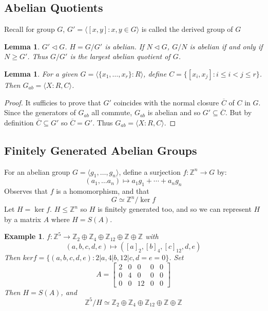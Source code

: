 \documentclass[a4paper,10pt]{article}
\newcommand{\ZZ}{\mathbb{Z}}
\newtheorem{eg}[thm]{Example}
\newtheorem{Lem}[thm]{Lemma}
\begin{document}
\subsection{Abelian Quotients}

Recall for group $G$, $G' = \langle [x,y] : x,y \in G \rangle$ is called the derived group of $G$
\begin{Lem}
$G' \triangleleft G$. $H = G / G'$ is abelian. If $N \triangleleft G$, $G / N$ is abelian if and only if $N \geq G'$. Thus $G / G'$ is the largest abelian quotient of $G$.  
\end{Lem}

\begin{Lem}
For a given $G = \langle \{x_1,\dots, x_r\} : R \rangle$, define $C = \{ [ x_i, x_j ] : i \leq i < j \leq r \}$. Then $G_{ab} = \langle X : R, C \rangle$. 
\end{Lem}

\begin{proof}
It sufficies to prove that $G'$ coincides with the normal closure $\overline{C}$ of $C$ in $G$. Since the generators of $G_{ab}$ all commute, $G_{ab}$ is abelian and so $G' \subseteq \overline{C}$. But by definition $\overline{C} \subseteq G'$ so $\overline{C} = G'$. Thus $G_{ab} = \langle X : R,C \rangle$.  
\end{proof}

\subsection{Finitely Generated Abelian Groups}
For an abelian group $G = \langle g_1, \dots, g_n\rangle$, define a surjection $f : \ZZ^n \rightarrow G$ by:
\[ (a_1, \dots a_n) \mapsto a_1 g_1 + \cdots + a_n g_n \]
Observes that $f$ is a homomorphism, and that
\[ G \simeq \ZZ^n / \ker f \]
Let $H = \ker f$. $H \leq \ZZ^n$ so $H$ is finitely generated too, and so we can represent $H$ by a matrix $A$ where $H = S(A)$. 

\begin{eg}
$f: \ZZ^5 \rightarrow \ZZ_2 \oplus \ZZ_4 \oplus \ZZ_{12} \oplus \ZZ \oplus \ZZ$ with 
\[ (a,b,c,d,e) \mapsto ([a]_2, [b]_4, [c]_{12}, d, e) \]
Then $ker f = \{ (a,b,c,d,e): 2 | a, 4 | b, 12 | c, d = e = 0 \}$. Set 
\[ A = \begin{bmatrix}
 2 & 0 & 0 & 0 & 0 \\
 0 & 4 & 0 & 0 & 0 \\
 0 & 0 & 12 & 0 & 0
 \end{bmatrix} \]
Then $H = S(A)$, and
\[ \ZZ^5 / H \simeq \ZZ_2 \oplus \ZZ_4 \oplus \ZZ_{12} \oplus \ZZ \oplus \ZZ \]
\end{eg}
\end{document}
